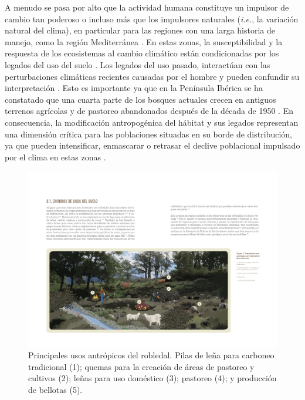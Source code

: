 A menudo se pasa por alto que la actividad humana constituye un impulsor de cambio tan poderoso o incluso más que los impulsores naturales (\emph{i.e.}, la variación natural del clima), en particular para las regiones con una larga historia de manejo, como la región Mediterránea \autocites{NavarroGonzalezetal2013WeightLanduse,DoblasMirandaetal2017ReviewCombination}. En estas zonas, la susceptibilidad y la respuesta de los ecosistemas al cambio climático están condicionadas por los legados del uso del suelo \autocites{Munteanuetal2015Legacies19th,Mausolfetal2018LegacyEffects}. Los legados del uso pasado, interactúan con las perturbaciones climáticas recientes causadas por el hombre y pueden confundir su interpretación \autocite{Fosteretal2003ImportanceLanduse}. Esto es importante ya que en la Península Ibérica se ha constatado que una cuarta parte de los bosques actuales crecen en antiguos terrenos agrícolas y de pastoreo abandonados después de la década de 1950 \autocite{VilaCabreraetal2017NewForests}. En consecuencia, la modificación antropogénica del hábitat y sus legados representan una dimensión crítica para las poblaciones situadas en su borde de distribución, ya que pueden intensificar, enmascarar o retrasar el declive poblacional impulsado por el clima en estas zonas \autocites{VilaCabreraJump2019GreaterGrowtha,SanchezdeDiosetal2020FagusSylvatica}. 
\begin{figure}[H]
	\centering
	\includegraphics[width=\textwidth]{img/intro/intro-usos.pdf} \caption{Principales usos antrópicos del robledal. Pilas de leña para carboneo tradicional (1); quemas para la creación de áreas de pastoreo y cultivos (2); leñas para uso doméstico (3); pastoreo (4); y producción de bellotas (5). \autocite[Fuente: ][]{PerezLuqueetal2021ManualGestion}}\label{fig:intro:usos}
\end{figure}

